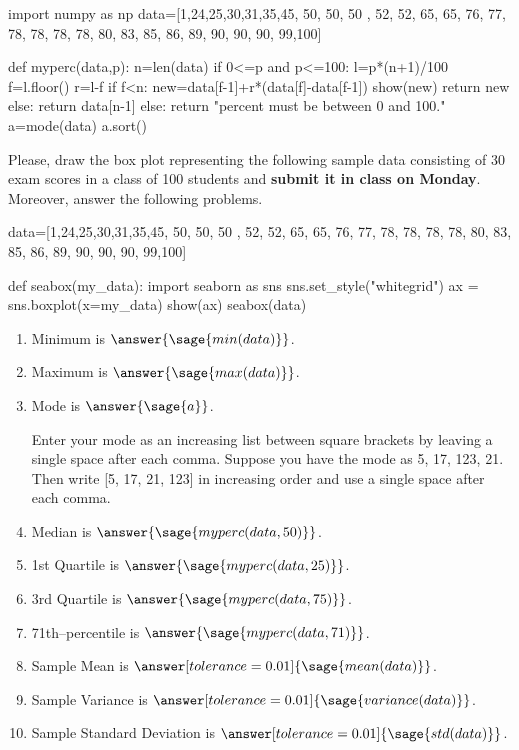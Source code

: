 \documentclass{ximera}
\begin{document}
\begin{problem}
\begin{sagesilent}
import numpy as np
data=[1,24,25,30,31,35,45, 50, 50, 50 , 52, 52, 65, 65, 76, 77, 78, 78, 78, 78, 80, 83, 85, 86, 89, 90, 90, 90, 99,100]

def myperc(data,p):
    n=len(data)
    if 0<=p and p<=100:
        l=p*(n+1)/100
        f=l.floor()
        r=l-f
        if f<n:
            new=data[f-1]+r*(data[f]-data[f-1])
            show(new)
            return new
        else:
            return data[n-1]
    else:
        return "percent must be between 0 and 100."
a=mode(data)
a.sort()
\end{sagesilent}
Please, draw the box plot representing the following sample data consisting of 30 exam scores in a class of 100 students and \textbf{submit it in class on Monday}. Moreover, answer the following problems.

\begin{sageOutput}
data=[1,24,25,30,31,35,45, 50, 50, 50 , 52, 52, 65, 65, 76, 77, 78, 78, 78, 78, 80, 83, 85, 86, 89, 90, 90, 90, 99,100]

def seabox(my_data):
    import seaborn as sns
    sns.set_style("whitegrid")
    ax = sns.boxplot(x=my_data)
    show(ax)
seabox(data)
\end{sageOutput}

\begin{enumerate}
    \item Minimum is $\answer{\sage{min(data)}}$.
    \item Maximum is $\answer{\sage{max(data)}}$.
    \item Mode is $\answer{\sage{a}}$.
        \begin{hint}
        Enter your mode as an increasing list between square brackets by leaving a single space after each comma. 
        Suppose you have the mode as 5, 17, 123, 21. Then write {\color{red}[5, 17, 21, 123]} in increasing         order and use a single space after each comma.
        \end{hint}
    \item Median is $\answer{\sage{myperc(data,50)}}$.
    \item 1st Quartile is $\answer{\sage{myperc(data,25)}}$.
    \item 3rd Quartile is $\answer{\sage{myperc(data,75)}}$.
    \item 71th--percentile is $\answer{\sage{myperc(data,71)}}$.
    \item Sample Mean is $\answer[tolerance=0.01]{\sage{mean(data)}}$.
    \item Sample Variance is $\answer[tolerance=0.01]{\sage{variance(data)}}$.
    \item Sample Standard Deviation is $\answer[tolerance=0.01]{\sage{std(data)}}$.
\end{enumerate}
\end{problem}
\end{document}
